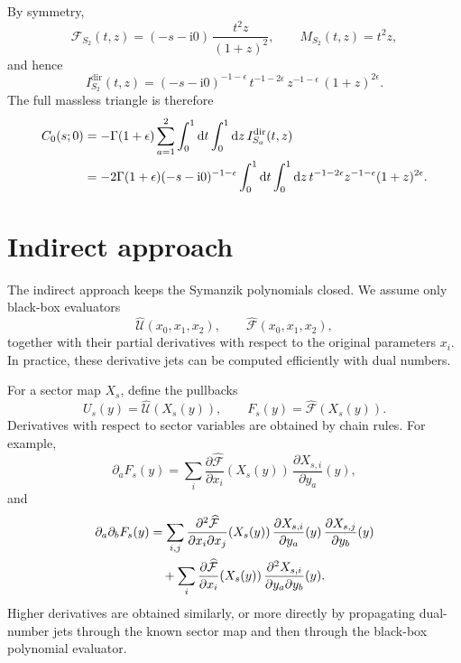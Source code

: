 \documentclass[11pt]{article}
\newcommand{\dd}{\mathrm d}
\newcommand{\ii}{\mathrm i}
\newcommand{\eps}{\epsilon}
\newcommand{\F}{\mathcal F}
\newcommand{\hU}{\widehat{\mathcal U}}
\newcommand{\hF}{\widehat{\mathcal F}}
\begin{document}
By symmetry,
\begin{equation}
  \F_{S_2}(t,z)
  =
  (-s-\ii0)\,\frac{t^2z}{(1+z)^2},
  \qquad
  M_{S_2}(t,z)=t^2z,
\end{equation}
and hence
\begin{equation}
  I_{S_2}^{\mathrm{dir}}(t,z)
  =
  (-s-\ii0)^{-1-\eps}\,
  t^{-1-2\eps}\,
  z^{-1-\eps}\,
  (1+z)^{2\eps}.
\end{equation}
The full massless triangle is therefore
\begin{align}
  C_0(s;0)
  &=
  -\Gamma(1+\eps)
  \sum_{a=1}^{2}
  \int_0^1\dd t
  \int_0^1\dd z\,
  I_{S_a}^{\mathrm{dir}}(t,z)
  \notag\\
  &=
  -2\Gamma(1+\eps)
  (-s-\ii0)^{-1-\eps}
  \int_0^1\dd t
  \int_0^1\dd z\,
  t^{-1-2\eps}
  z^{-1-\eps}
  (1+z)^{2\eps}.
\end{align}

\section{Indirect approach}

The indirect approach keeps the Symanzik polynomials closed.  We assume only
black-box evaluators
\begin{equation}
  \hU(x_0,x_1,x_2),
  \qquad
  \hF(x_0,x_1,x_2),
\end{equation}
together with their partial derivatives with respect to the original
parameters \(x_i\).  In practice, these derivative jets can be computed
efficiently with dual numbers.

For a sector map \(X_s\), define the pullbacks
\begin{equation}
  U_s(y)=\hU(X_s(y)),
  \qquad
  F_s(y)=\hF(X_s(y)).
\end{equation}
Derivatives with respect to sector variables are obtained by chain rules.  For
example,
\begin{equation}
  \partial_a F_s(y)
  =
  \sum_i
  \frac{\partial \hF}{\partial x_i}(X_s(y))\,
  \frac{\partial X_{s,i}}{\partial y_a}(y),
\end{equation}
and
\begin{align}
  \partial_a\partial_b F_s(y)
  &=
  \sum_{i,j}
  \frac{\partial^2 \hF}{\partial x_i\partial x_j}(X_s(y))\,
  \frac{\partial X_{s,i}}{\partial y_a}(y)\,
  \frac{\partial X_{s,j}}{\partial y_b}(y)
  \notag\\
  &\quad
  +
  \sum_i
  \frac{\partial \hF}{\partial x_i}(X_s(y))\,
  \frac{\partial^2 X_{s,i}}{\partial y_a\partial y_b}(y).
\end{align}
Higher derivatives are obtained similarly, or more directly by propagating
dual-number jets through the known sector map and then through the black-box
polynomial evaluator.
\end{document}
